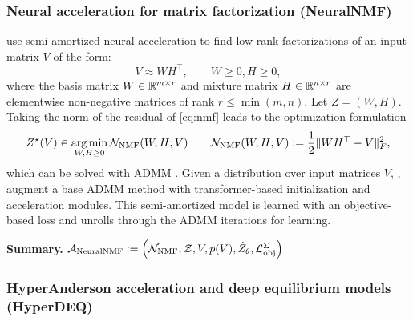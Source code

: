\documentclass[twoside,11pt]{article}
\begin{document}
\subsubsection{Neural acceleration for matrix factorization (NeuralNMF)}
\citet{sjolund2022graphbased} use semi-amortized neural acceleration
to find low-rank factorizations of an input matrix $V$ of the form:
\begin{equation}
  V\approx WH^\top, \qquad W\geq 0, H\geq 0,
  \label{eq:nmf}
\end{equation}
where the basis matrix $W\in\mathbb{R}^{m\times r}$ and
mixture matrix $H\in\mathbb{R}^{n\times r}$ are elementwise
non-negative matrices of rank $r\leq\min(m,n)$.
Let $Z=(W,H)$. Taking the norm of the residual of \cref{eq:nmf}
leads to the optimization formulation
\begin{equation}
  Z^\star(V)\in \operatorname*{arg\,min}_{W,H\geq 0} {\mathcal{N}}_{\rm NMF}(W, H; V) \qquad
  {\mathcal{N}}_{\rm NMF}(W, H; V)\vcentcolon= \frac{1}{2}\|WH^\top - V\|_F^2,
  \label{eq:nmf-opt}
\end{equation}
which can be solved with ADMM \citep{boyd2011distributed}.
Given a distribution over input matrices $V$,
\citet{sjolund2022graphbased}, augment a base ADMM
method with transformer-based initialization and
acceleration modules.
This semi-amortized model is learned with an
objective-based loss and unrolls through
the ADMM iterations for learning.

\textbf{Summary.}
${\mathcal{A}}_{\rm NeuralNMF}\vcentcolon=\left({\mathcal{N}}_{\rm NMF}, {\mathcal{Z}}, V, p(V), \hat Z_\theta, {\mathcal{L}}_{\rm obj}^\Sigma\right)$

\subsubsection{HyperAnderson acceleration and
  deep equilibrium models (HyperDEQ)}
\label{sec:apps:deq}
\end{document}

